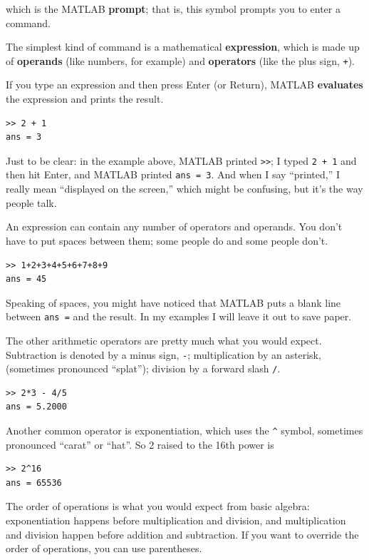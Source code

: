 \documentclass{book}
\begin{document}
which is the MATLAB {\bf prompt}; that is, this symbol prompts you
to enter a command.

The simplest kind of command is a mathematical {\bf expression}, which
is made up of {\bf operands} (like numbers, for example) and
{\bf operators} (like the plus sign, {\tt +}).

If you type an expression and then press Enter (or Return), MATLAB
{\bf evaluates} the expression and prints the result.

\begin{verbatim}
>> 2 + 1
ans = 3
\end{verbatim}

Just to be clear: in the example above, MATLAB printed {\tt >>}; I
typed {\tt 2 + 1} and then hit Enter, and MATLAB printed {\tt ans = 3}.
And when I say ``printed,'' I really mean ``displayed on the screen,''
which might be confusing, but it's the way people talk.

An expression can contain any number of operators and operands.  You
don't have to put spaces between them; some people do and some people
don't.

\begin{verbatim}
>> 1+2+3+4+5+6+7+8+9
ans = 45
\end{verbatim}

Speaking of spaces, you might have noticed that MATLAB puts a blank 
line between {\tt ans =} and the result.  In my examples I will leave
it out to save paper.

The other arithmetic operators are pretty much what you would expect.
Subtraction is denoted by a minus sign, {\tt -}; multiplication by
an asterisk, {\tt *} (sometimes pronounced ``splat''); division by
a forward slash {\tt /}.

\begin{verbatim}
>> 2*3 - 4/5
ans = 5.2000
\end{verbatim}

Another common operator is exponentiation, which uses the \verb+^+
symbol, sometimes pronounced ``carat'' or ``hat''.  So 2 raised to the
16th power is

\begin{verbatim}
>> 2^16
ans = 65536
\end{verbatim}

The order of operations is what you would expect from basic algebra:
exponentiation happens before multiplication
and division, and
multiplication and division happen before addition and subtraction.
If you want to override the order of operations, you can use parentheses.
\end{document}
